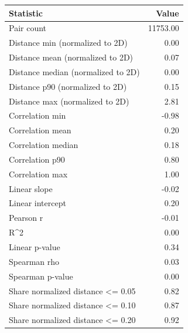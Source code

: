 \begin{tabular}{lr}
\toprule
Statistic & Value \\
\midrule
Pair count & 11753.00 \\
Distance min (normalized to 2D) & 0.00 \\
Distance mean (normalized to 2D) & 0.07 \\
Distance median (normalized to 2D) & 0.00 \\
Distance p90 (normalized to 2D) & 0.15 \\
Distance max (normalized to 2D) & 2.81 \\
Correlation min & -0.98 \\
Correlation mean & 0.20 \\
Correlation median & 0.18 \\
Correlation p90 & 0.80 \\
Correlation max & 1.00 \\
Linear slope & -0.02 \\
Linear intercept & 0.20 \\
Pearson r & -0.01 \\
R^2 & 0.00 \\
Linear p-value & 0.34 \\
Spearman rho & 0.03 \\
Spearman p-value & 0.00 \\
Share normalized distance <= 0.05 & 0.82 \\
Share normalized distance <= 0.10 & 0.87 \\
Share normalized distance <= 0.20 & 0.92 \\
\bottomrule
\end{tabular}

